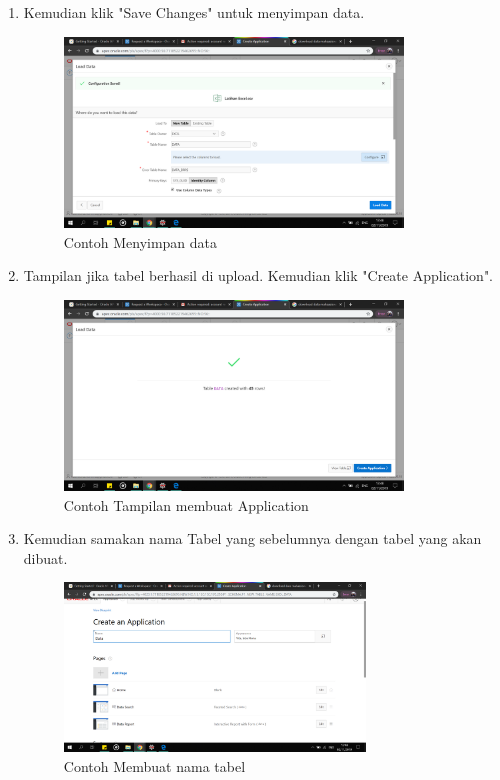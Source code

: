 \begin{enumerate}
\item Kemudian klik "Save Changes" untuk menyimpan data.
    \begin{figure}[!htbp]
    \centering
    \includegraphics[width=9cm]{picture/25.png}
    \caption{Contoh Menyimpan data}
    \end{figure}
    
\item Tampilan jika tabel berhasil di upload. Kemudian klik "Create Application".
    \begin{figure}[!htbp]
    \centering
    \includegraphics[width=9cm]{picture/26.png}
    \caption{Contoh Tampilan membuat Application}
    \end{figure}
    
\newpage
\item Kemudian samakan nama Tabel yang sebelumnya dengan tabel yang akan dibuat.
    \begin{figure}[!htbp]
    \centering
    \includegraphics[width=8cm]{picture/27.png}
    \caption{Contoh Membuat nama tabel}
    \end{figure}
    

\end{enumerate}
